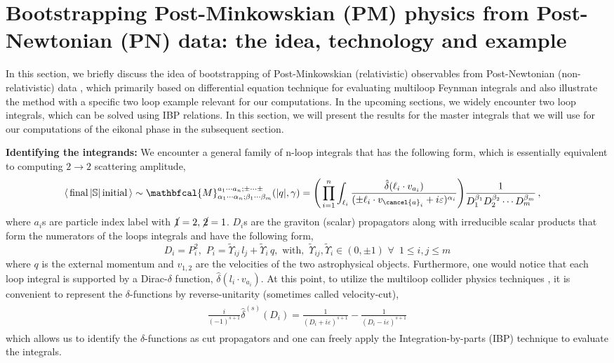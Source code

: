 \section{Bootstrapping Post-Minkowskian (PM) physics from Post-Newtonian (PN) data: the idea, technology and example}
\label{ch3:sec3}
In this section, we briefly discuss the idea of bootstrapping of Post-Minkowskian (relativistic) observables from Post-Newtonian (non-relativistic) data \cite{Dlapa:2023hsl,Henn:2014qga},  which primarily based on differential equation technique for evaluating multiloop Feynman integrals \cite{Kotikov:1990kg,Gehrmann:1999as} and also illustrate the method with a specific two loop example relevant for our computations. In the upcoming sections, we widely encounter two loop integrals, which can be solved using IBP relations. In this section, we will present the results for the master integrals that we will use for our computations of the eikonal phase in the subsequent section.

\textbf{Identifying the integrands:} We encounter a general family of n-loop integrals that has the following form, which is essentially equivalent to computing $2\to 2$ scattering amplitude,
\begin{align}
           &\langle \,\textrm{final}\,|\mathbb{S}|\,\textrm{initial}\,\rangle\sim\mathbfcal{M}^{a_1\cdots a_n;\pm\cdots \pm}_{\alpha_1\cdots \alpha_n;\beta_1\cdots \beta_m}(|q|,\gamma)=\Bigg(\prod_{i=1}^n\int_{\ell_i}\frac{\hat\delta(\ell_i\cdot v_{a_i})}{(\pm \ell_i\cdot v_{\cancel{a}_i}+i\varepsilon)^{\alpha_i}}\Bigg)\frac{1}{D_1^{\beta _1 }D_2^{\beta_2}\cdots D_m^{\beta_m}}\,,
\end{align}
where $a_i$s are particle index label with $\cancel{1}=2,\,\cancel{2}=1$. $D_i$s are the graviton (scalar) propagators along with irreducible scalar products that form the numerators of the loops integrals and have the following form,
$$D_i=P_i^2,\,\,P_i=\tilde\Upsilon_{ij}\,l_j+\tilde\Upsilon_i\, q,\,\,\textrm{with},\,\,\tilde\Upsilon_{ij},\tilde\Upsilon_i\in(0,\pm 1)\,\,\forall\,\,\, 1\le i,j\le m$$
where $q$ is the external momentum and $v_{1,2}$ are the velocities of the two astrophysical objects. Furthermore, one would notice that each loop integral is supported by a Dirac-$\delta$ function, $\hat\delta(l_i\cdot v_{a_i})$. At this point, to utilize the multiloop collider physics techniques \cite{Weinzierl:2022eaz}, it is convenient to represent the $\delta$-functions by reverse-unitarity (sometimes called velocity-cut),
\begin{align}
    \begin{split}
       \frac{i}{(-1)^{s+1}} \hat\delta^{(s)}(D_i)=\frac{1}{(D_i+i\varepsilon)^{s+1}}-\frac{1}{(D_i-i\varepsilon)^{s+1}}
    \end{split}
\end{align}                 
which allows us to identify the $\delta$-functions as cut propagators and one can freely apply the Integration-by-parts (IBP) technique to evaluate the integrals.

